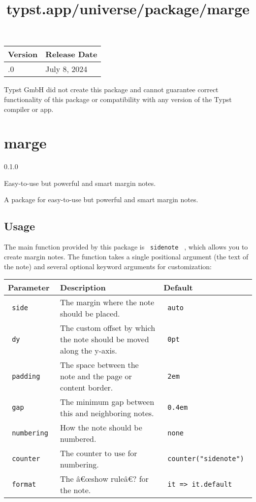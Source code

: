 \begin{longtable}[]{@{}ll@{}}
\toprule\noalign{}
Version & Release Date \\
\midrule\noalign{}
\endhead
\bottomrule\noalign{}
\endlastfoot
0.1.0 & July 8, 2024 \\
\end{longtable}

Typst GmbH did not create this package and cannot guarantee correct
functionality of this package or compatibility with any version of the
Typst compiler or app.


\title{typst.app/universe/package/marge}

\label{banner}
\section{marge}\label{marge}

{ 0.1.0 }

Easy-to-use but powerful and smart margin notes.

\label{readme}
A package for easy-to-use but powerful and smart margin notes.

\subsection{Usage}\label{usage}

The main function provided by this package is \texttt{\ sidenote\ } ,
which allows you to create margin notes. The function takes a single
positional argument (the text of the note) and several optional keyword
arguments for customization:

\begin{longtable}[]{@{}lll@{}}
\toprule\noalign{}
Parameter & Description & Default \\
\midrule\noalign{}
\endhead
\bottomrule\noalign{}
\endlastfoot
\texttt{\ side\ } & The margin where the note should be placed. &
\texttt{\ auto\ } \\
\texttt{\ dy\ } & The custom offset by which the note should be moved
along the y-axis. & \texttt{\ 0pt\ } \\
\texttt{\ padding\ } & The space between the note and the page or
content border. & \texttt{\ 2em\ } \\
\texttt{\ gap\ } & The minimum gap between this and neighboring notes. &
\texttt{\ 0.4em\ } \\
\texttt{\ numbering\ } & How the note should be numbered. &
\texttt{\ none\ } \\
\texttt{\ counter\ } & The counter to use for numbering. &
\texttt{\ counter("sidenote")\ } \\
\texttt{\ format\ } & The â€œshow ruleâ€? for the note. &
\texttt{\ it\ =\textgreater{}\ it.default\ } \\
\end{longtable}

